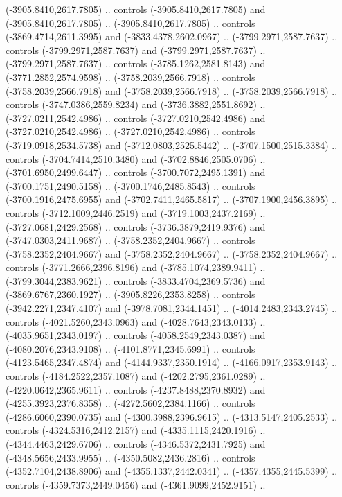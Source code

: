 \begin{scope}[shift={(430.80877,-416.69739)}]
\begin{scope}[shift={(4537.8125,-1856.4436)}]
\begin{scope}[shift={(-148.39113,-28.14259)}]
        (-3905.8410,2617.7805) .. controls (-3905.8410,2617.7805) and
        (-3905.8410,2617.7805) .. (-3905.8410,2617.7805) .. controls
        (-3869.4714,2611.3995) and (-3833.4378,2602.0967) .. (-3799.2971,2587.7637) ..
        controls (-3799.2971,2587.7637) and (-3799.2971,2587.7637) ..
        (-3799.2971,2587.7637) .. controls (-3785.1262,2581.8143) and
        (-3771.2852,2574.9598) .. (-3758.2039,2566.7918) .. controls
        (-3758.2039,2566.7918) and (-3758.2039,2566.7918) .. (-3758.2039,2566.7918) ..
        controls (-3747.0386,2559.8234) and (-3736.3882,2551.8692) ..
        (-3727.0211,2542.4986) .. controls (-3727.0210,2542.4986) and
        (-3727.0210,2542.4986) .. (-3727.0210,2542.4986) .. controls
        (-3719.0918,2534.5738) and (-3712.0803,2525.5442) .. (-3707.1500,2515.3384) ..
        controls (-3704.7414,2510.3480) and (-3702.8846,2505.0706) ..
        (-3701.6950,2499.6447) .. controls (-3700.7072,2495.1391) and
        (-3700.1751,2490.5158) .. (-3700.1746,2485.8543) .. controls
        (-3700.1916,2475.6955) and (-3702.7411,2465.5817) .. (-3707.1900,2456.3895) ..
        controls (-3712.1009,2446.2519) and (-3719.1003,2437.2169) ..
        (-3727.0681,2429.2568) .. controls (-3736.3879,2419.9376) and
        (-3747.0303,2411.9687) .. (-3758.2352,2404.9667) .. controls
        (-3758.2352,2404.9667) and (-3758.2352,2404.9667) .. (-3758.2352,2404.9667) ..
        controls (-3771.2666,2396.8196) and (-3785.1074,2389.9411) ..
        (-3799.3044,2383.9621) .. controls (-3833.4704,2369.5736) and
        (-3869.6767,2360.1927) .. (-3905.8226,2353.8258) .. controls
        (-3942.2271,2347.4107) and (-3978.7081,2344.1451) .. (-4014.2483,2343.2745) ..
        controls (-4021.5260,2343.0963) and (-4028.7643,2343.0133) ..
        (-4035.9651,2343.0197) .. controls (-4058.2549,2343.0387) and
        (-4080.2076,2343.9108) .. (-4101.8771,2345.6991) .. controls
        (-4123.5465,2347.4874) and (-4144.9337,2350.1914) .. (-4166.0917,2353.9143) ..
        controls (-4184.2522,2357.1087) and (-4202.2795,2361.0289) ..
        (-4220.0642,2365.9611) .. controls (-4237.8488,2370.8932) and
        (-4255.3923,2376.8358) .. (-4272.5602,2384.1166) .. controls
        (-4286.6060,2390.0735) and (-4300.3988,2396.9615) .. (-4313.5147,2405.2533) ..
        controls (-4324.5316,2412.2157) and (-4335.1115,2420.1916) ..
        (-4344.4463,2429.6706) .. controls (-4346.5372,2431.7925) and
        (-4348.5656,2433.9955) .. (-4350.5082,2436.2816) .. controls
        (-4352.7104,2438.8906) and (-4355.1337,2442.0341) .. (-4357.4355,2445.5399) ..
        controls (-4359.7373,2449.0456) and (-4361.9099,2452.9151) ..

\end{scope}
\end{scope}
\end{scope}
